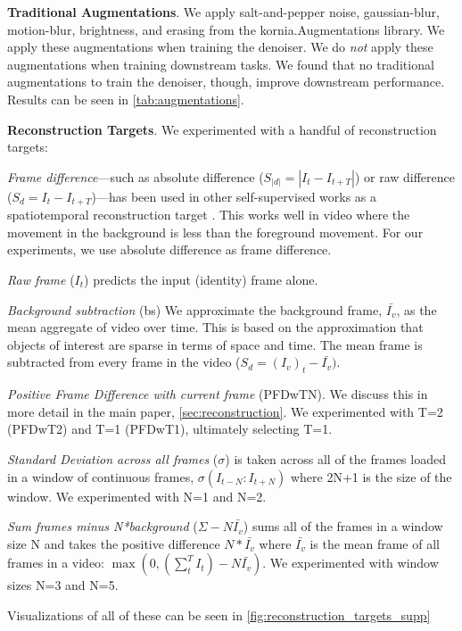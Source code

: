 \textbf{Traditional Augmentations}. We apply salt-and-pepper noise, gaussian-blur, motion-blur, brightness, and erasing from the kornia.Augmentations library. We apply these augmentations when training the denoiser. We do \textit{not} apply these augmentations when training downstream tasks. We found that no traditional augmentations to train the denoiser, though, improve downstream performance. Results can be seen in \cref{tab:augmentations}.

\textbf{Reconstruction Targets}. We experimented with a handful of reconstruction targets: 

\textit{Frame difference}---such as absolute difference ($S_{|d|}=|I_t - I_{t+T}|$) or raw difference ($S_d=I_t - I_{t+T}$)---has been used in other self-supervised works as a spatiotemporal reconstruction target \cite{sun2022bkind}. This works well in video where the movement in the background is less than the foreground movement. For our experiments, we use absolute difference as frame difference.

\textit{Raw frame} ($I_t$) predicts the input (identity) frame alone.

\textit{Background subtraction} (bs) We approximate the background frame,  $\bar{I_v}$, as the mean aggregate of video over time. This is based on the approximation that objects of interest are sparse in terms of space and time. The mean frame is subtracted from every frame in the video ($S_d=(I_{v})_t - \bar{I_v})$. 

\textit{Positive Frame Difference with current frame} (PFDwTN). We discuss this in more detail in the main paper, \cref{sec:reconstruction}. We experimented with T=2 (PFDwT2) and T=1 (PFDwT1), ultimately selecting T=1. 

\textit{Standard Deviation across all frames} ($\sigma$) is taken across all of the frames loaded in a window of continuous frames, $\sigma(I_{t-N}:I_{t+N})$ where 2N+1 is the size of the window. We experimented with N=1 and N=2.

\textit{Sum frames minus N*background} ($\Sigma-N\bar{I_v}$) sums all of the frames in a window size N and takes the positive difference $N*\bar{I_v}$ where $\bar{I_v}$ is the mean frame of all frames in a video: $\max(0, (\sum_t^{T}I_t) - N\bar{I_v})$. We experimented with window sizes N=3 and N=5.

Visualizations of all of these can be seen in \cref{fig:reconstruction_targets_supp}

